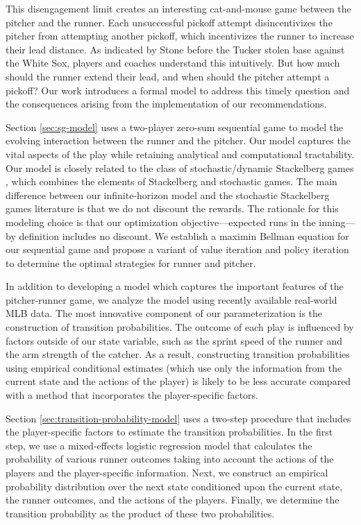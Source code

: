 \documentclass[11pt]{article}
\begin{document}
    This disengagement limit creates an interesting cat-and-mouse game between the pitcher and the runner. Each unsuccessful pickoff attempt disincentivizes the pitcher from attempting another pickoff, which incentivizes the runner to increase their lead distance. As indicated by Stone before the Tucker stolen base against the White Sox, players and coaches understand this intuitively. But how much should the runner extend their lead, and when should the pitcher attempt a pickoff? Our work introduces a formal model to address this timely question and the consequences arising from the implementation of our recommendations.
    
    Section \ref{sec:sg-model} uses a two-player zero-sum sequential game to model the evolving interaction between the runner and the pitcher.  Our model captures the vital aspects of the play while retaining analytical and computational tractability. Our model is closely related to the class of stochastic/dynamic Stackelberg games \parencite{goktas_zero-sum_2022,li_review_2017,lopez_stationary_2023,vasal_sequential_2022,vorobeychik_computing_2012}, which combines the elements of Stackelberg and stochastic games. The main difference between our infinite-horizon model and the stochastic Stackelberg games literature is that we do not discount the rewards. The rationale for this modeling choice is that our optimization objective---expected runs in the inning---by definition includes no discount. We establish a maximin Bellman equation for our sequential game and propose a variant of value iteration and policy iteration to determine the optimal strategies for runner and pitcher.

    In addition to developing a model which captures the important features of the pitcher-runner game, we analyze the model using recently available real-world MLB data. The most innovative component of our parameterization is the construction of transition probabilities. The outcome of each play is influenced by factors outside of our state variable, such as the sprint speed of the runner and the arm strength of the catcher. As a result, constructing transition probabilities using empirical conditional estimates (which use only the information from the current state and the actions of the player) is likely to be less accurate compared with a method that incorporates the player-specific factors.
    
    Section \ref{sec:transition-probability-model} uses a two-step procedure that includes the player-specific factors to estimate the transition probabilities. In the first step, we use a mixed-effects logistic regression model that calculates the probability of various runner outcomes taking into account the actions of the players and the player-specific information. Next, we construct an empirical probability distribution over the next state conditioned upon the current state, the runner outcomes, and the actions of the players. Finally, we determine the transition probability as the product of these two probabilities.
\end{document}

